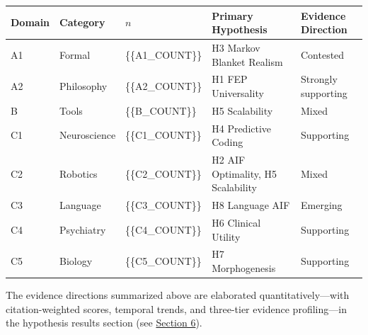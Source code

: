 \documentclass[
]{article}
\newcounter{none} %
\begin{document}
{\def\LTcaptype{none} %
\begin{longtable}[]{@{}
  >{\raggedright\arraybackslash}p{}
  >{\raggedright\arraybackslash}p{}
  >{\raggedright\arraybackslash}p{}
  >{\raggedright\arraybackslash}p{}
  >{\raggedright\arraybackslash}p{}@{}}
\toprule\noalign{}
\begin{minipage}[b]{\linewidth}\raggedright
Domain
\end{minipage} & \begin{minipage}[b]{\linewidth}\raggedright
Category
\end{minipage} & \begin{minipage}[b]{\linewidth}\raggedright
\(n\)
\end{minipage} & \begin{minipage}[b]{\linewidth}\raggedright
Primary Hypothesis
\end{minipage} & \begin{minipage}[b]{\linewidth}\raggedright
Evidence Direction
\end{minipage} \\
\midrule\noalign{}
\endhead
\bottomrule\noalign{}
\endlastfoot
A1 & Formal & \{\{A1\_COUNT\}\} & H3 Markov Blanket Realism &
Contested \\
A2 & Philosophy & \{\{A2\_COUNT\}\} & H1 FEP Universality & Strongly
supporting \\
B & Tools & \{\{B\_COUNT\}\} & H5 Scalability & Mixed \\
C1 & Neuroscience & \{\{C1\_COUNT\}\} & H4 Predictive Coding &
Supporting \\
C2 & Robotics & \{\{C2\_COUNT\}\} & H2 AIF Optimality, H5 Scalability &
Mixed \\
C3 & Language & \{\{C3\_COUNT\}\} & H8 Language AIF & Emerging \\
C4 & Psychiatry & \{\{C4\_COUNT\}\} & H6 Clinical Utility &
Supporting \\
C5 & Biology & \{\{C5\_COUNT\}\} & H7 Morphogenesis & Supporting \\
\end{longtable}
}

The evidence directions summarized above are elaborated
quantitatively---with citation-weighted scores, temporal trends, and
three-tier evidence profiling---in the hypothesis results section (see
\hyperref[sec:hypothesis_results]{Section 6}).
\end{document}
